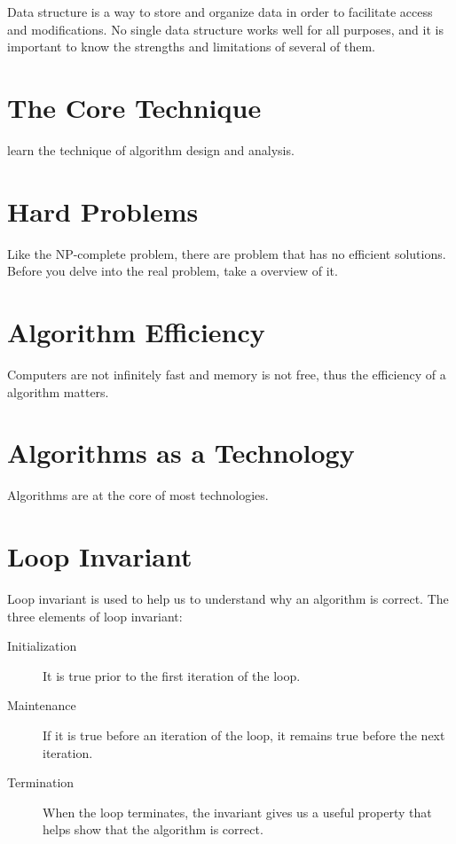 Data structure is a way to store and organize data in order to facilitate access and modifications.
No single data structure works well for all purposes, and it is important to know the strengths and limitations of several of them.

\section{The Core Technique}
\label{sec:core-technique}


learn the technique of algorithm design and analysis.

\section{Hard Problems}
\label{sec:hard-problems}


Like the NP-complete problem, there are problem that has no efficient solutions.
Before you delve into the real problem, take a overview of it.


\section{Algorithm Efficiency}
\label{sec:algorithm-efficiency}


Computers are not infinitely fast and memory is not free, thus the efficiency of a algorithm matters.

\section{Algorithms as a Technology}
\label{sec:algor-as-techn}


Algorithms are at the core of most technologies.



\section{Loop Invariant}
\label{sec:loop-invariant}


Loop invariant is used to help us to understand why an algorithm is correct.
The three elements of loop invariant:


\begin{description}
\item[Initialization] It is true prior to the first iteration of the   loop.
\item[Maintenance] If it is true before an iteration of the loop, it   remains true before the next iteration.
\item[Termination] When the loop terminates, the invariant gives us a useful property that helps show that the algorithm is correct.
\end{description}




